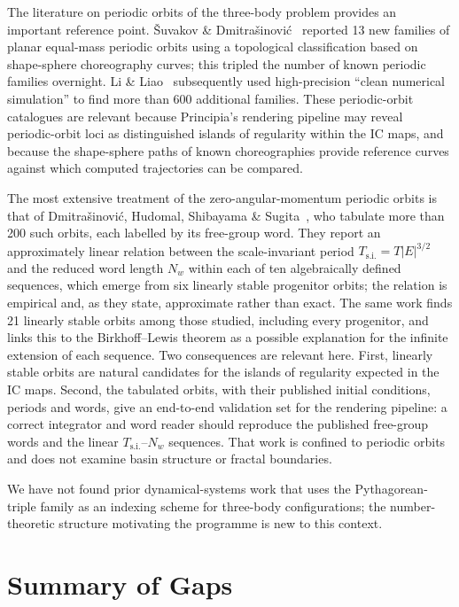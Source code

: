 \documentclass[11pt,a4paper]{article}
\begin{document}
The literature on periodic orbits of the three-body problem provides an important reference
point.  \v{S}uvakov \& Dmitra\v{s}inovi\'{c}~\cite{suvakov2013} reported 13 new families of
planar equal-mass periodic orbits using a topological classification based on shape-sphere
choreography curves; this tripled the number of known periodic families overnight.  Li \&
Liao~\cite{li2017} subsequently used high-precision ``clean numerical simulation'' to find
more than 600 additional families.  These periodic-orbit catalogues are relevant because
Principia's rendering pipeline may reveal periodic-orbit loci as distinguished islands of
regularity within the IC maps, and because the shape-sphere paths of known choreographies
provide reference curves against which computed trajectories can be compared.

The most extensive treatment of the zero-angular-momentum periodic orbits is that of
Dmitra\v{s}inovi\'{c}, Hudomal, Shibayama \& Sugita~\cite{dmitrasinovic2018}, who tabulate more
than 200 such orbits, each labelled by its free-group word.  They report an approximately linear
relation between the scale-invariant period $T_{\mathrm{s.i.}} = T|E|^{3/2}$ and the reduced
word length $N_w$ within each of ten algebraically defined sequences, which emerge from six
linearly stable progenitor orbits; the relation is empirical and, as they state, approximate
rather than exact.  The same work finds 21 linearly stable orbits among those studied, including
every progenitor, and links this to the Birkhoff--Lewis theorem as a possible explanation for
the infinite extension of each sequence.  Two consequences are relevant here.  First, linearly
stable orbits are natural candidates for the islands of regularity expected in the IC maps.
Second, the tabulated orbits, with their published initial conditions, periods and words, give
an end-to-end validation set for the rendering pipeline: a correct integrator and word reader
should reproduce the published free-group words and the linear $T_{\mathrm{s.i.}}$--$N_w$
sequences.  That work is confined to periodic orbits and does not examine basin structure or
fractal boundaries.

We have not found prior dynamical-systems work that uses the Pythagorean-triple family as an
indexing scheme for three-body configurations; the number-theoretic structure motivating the
programme is new to this context.

\section{Summary of Gaps}
\end{document}
